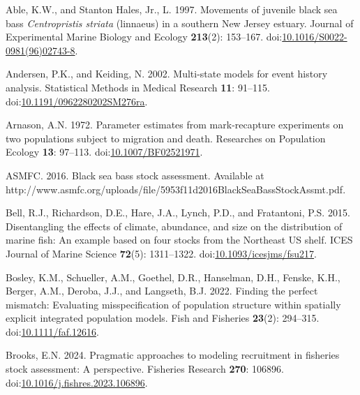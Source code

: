 \documentclass[
]{article}
\newlength{\cslhangindent}
\newlength{\cslentryspacingunit} %
\newenvironment{CSLReferences}[2] %
 {%
  \setlength{\parindent}{0pt}
  \ifodd #1
  \let\oldpar\par
  \def\par{\hangindent=\cslhangindent\oldpar}
  \fi
  \setlength{\parskip}{#2\cslentryspacingunit}
 }%
 {}
\begin{document}
\hypertarget{refs}{}
\begin{CSLReferences}{1}{0}
\leavevmode{}%
Able, K.W., and Stanton Hales, Jr., L. 1997. Movements of juvenile black
sea bass \emph{{C}entropristis striata} (linnaeus) in a southern {N}ew
{J}ersey estuary. Journal of Experimental Marine Biology and Ecology
\textbf{213}(2): 153--167.
doi:\href{https://doi.org/10.1016/S0022-0981(96)02743-8}{10.1016/S0022-0981(96)02743-8}.

\leavevmode{}%
Andersen, P.K., and Keiding, N. 2002. Multi-state models for event
history analysis. Statistical Methods in Medical Research \textbf{11}:
91--115.
doi:\href{https://doi.org/10.1191/0962280202SM276ra}{10.1191/0962280202SM276ra}.

\leavevmode{}%
Arnason, A.N. 1972. Parameter estimates from mark-recapture experiments
on two populations subject to migration and death. Researches on
Population Ecology \textbf{13}: 97--113.
doi:\href{https://doi.org/10.1007/BF02521971}{10.1007/BF02521971}.

\leavevmode{}%
ASMFC. 2016. Black sea bass stock assessment. {Available} at
http://www.asmfc.org/uploads/file/5953f11d2016BlackSeaBassStockAssmt.pdf.

\leavevmode{}%
Bell, R.J., Richardson, D.E., Hare, J.A., Lynch, P.D., and Fratantoni,
P.S. 2015. Disentangling the effects of climate, abundance, and size on
the distribution of marine fish: An example based on four stocks from
the {N}ortheast {US} shelf. ICES Journal of Marine Science
\textbf{72}(5): 1311--1322.
doi:\href{https://doi.org/10.1093/icesjms/fsu217}{10.1093/icesjms/fsu217}.

\leavevmode{}%
Bosley, K.M., Schueller, A.M., Goethel, D.R., Hanselman, D.H., Fenske,
K.H., Berger, A.M., Deroba, J.J., and Langseth, B.J. 2022. Finding the
perfect mismatch: Evaluating misspecification of population structure
within spatially explicit integrated population models. Fish and
Fisheries \textbf{23}(2): 294--315.
doi:\href{https://doi.org/10.1111/faf.12616}{10.1111/faf.12616}.

\leavevmode{}%
Brooks, E.N. 2024. Pragmatic approaches to modeling recruitment in
fisheries stock assessment: A perspective. Fisheries Research
\textbf{270}: 106896.
doi:\href{https://doi.org/10.1016/j.fishres.2023.106896}{10.1016/j.fishres.2023.106896}.


\end{CSLReferences}
\end{document}
